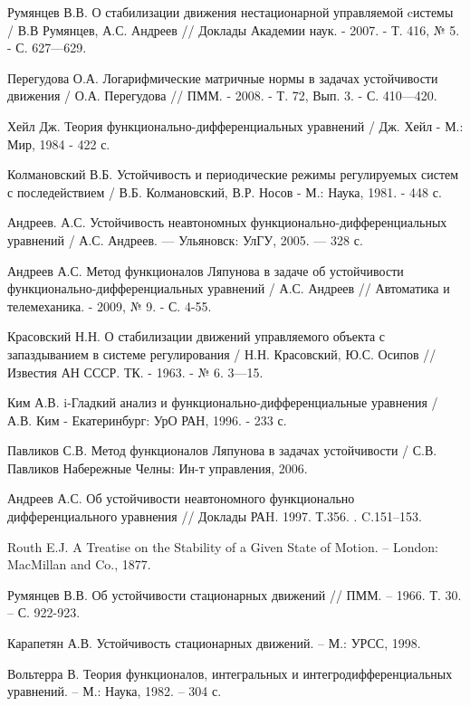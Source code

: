 \begin{thebibliography}{10}
	Румянцев В.В. О стабилизации движения нестационарной управляемой cистемы / В.В Румянцев, А.С. Андреев // Доклады Академии наук. - 2007. - Т. 416, № 5. - С. 627—629.
	
	Перегудова О.А. Логарифмические матричные нормы в задачах устойчивости движения / О.А. Перегудова // ПММ. - 2008. - Т. 72, Вып. 3. - С. 410—420.
	
	Хейл Дж. Теория функционально-дифференциальных уравнений / Дж. Хейл - М.: Мир, 1984 - 422 с.
	
	Колмановский В.Б. Устойчивость и периодические режимы регулируемых систем с последействием / В.Б. Колмановский, В.Р. Носов - М.: Наука, 1981. - 448 с.
	
	Андреев. А.С. Устойчивость неавтономных функционально-дифференциальных уравнений / А.С. Андреев. — Ульяновск: УлГУ, 2005. — 328 с.
	
	Андреев А.С. Метод функционалов Ляпунова в задаче об устойчивости функционально-дифференциальных уравнений / А.С. Андреев // Автоматика и телемеханика. - 2009, № 9. - С. 4-55.
	
	Красовский Н.Н. О стабилизации движений управляемого объекта с запаздыванием в системе регулирования / Н.Н. Красовский, Ю.С. Осипов // Известия АН СССР. ТК. - 1963. - № 6. 3—15.
	
	Ким А.В. i-Гладкий анализ и функционально-дифференциальные уравнения / А.В. Ким - Екатеринбург: УрО РАН, 1996. - 233 с.
	
	Павликов С.В. Метод функционалов Ляпунова в задачах устойчивости / С.В. Павликов Набережные Челны: Ин-т управления, 2006.
	
	Андреев А.С. Об устойчивости неавтономного функционально дифференциального уравнения // Доклады РАH. 1997. Т.356. . C.151--153.
	
	Routh E.J. A Treatise on the Stability of a Given State of Motion. -- London: MacMillan and Co., 1877.
	
	Румянцев В.В. Об устойчивости стационарных движений // ПММ. -- 1966. Т. 30. -- С. 922-923.
	
	Карапетян А.В. Устойчивость стационарных движений. -- М.: УРСС, 1998.
	
	Вольтерра В. Теория функционалов, интегральных и интегродифференциальных уравнений. -- М.: Наука, 1982. -- 304 с.
	

\end{thebibliography}
